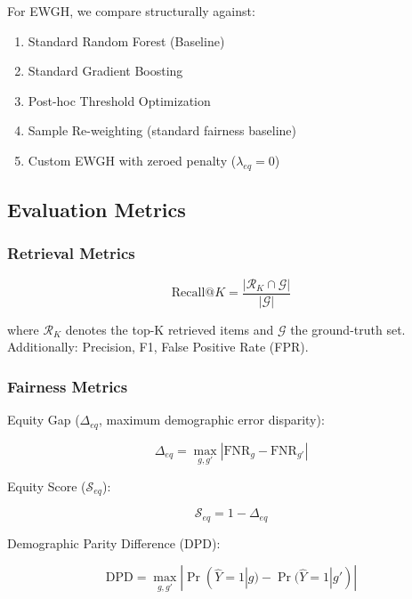 \documentclass[conference]{IEEEtran}
\begin{document}
For EWGH, we compare structurally against:
\begin{enumerate}
    \item Standard Random Forest (Baseline)
    \item Standard Gradient Boosting
    \item Post-hoc Threshold Optimization
    \item Sample Re-weighting (standard fairness baseline)
    \item Custom EWGH with zeroed penalty ($\lambda_{eq} = 0$)
\end{enumerate}

\subsection{Evaluation Metrics}

\subsubsection{Retrieval Metrics}

\begin{equation}
\text{Recall}@K = \frac{|\mathcal{R}_K \cap \mathcal{G}|}{|\mathcal{G}|}
\end{equation}

where $\mathcal{R}_K$ denotes the top-K retrieved items and $\mathcal{G}$ the ground-truth set. Additionally: Precision, F1, False Positive Rate (FPR).

\subsubsection{Fairness Metrics}

Equity Gap ($\Delta_{eq}$, maximum demographic error disparity):

\begin{equation}
\Delta_{eq} = \max_{g, g'} |\text{FNR}_g - \text{FNR}_{g'}|
\end{equation}

Equity Score ($\mathcal{S}_{eq}$):

\begin{equation}
\mathcal{S}_{eq} = 1 - \Delta_{eq}
\end{equation}

Demographic Parity Difference (DPD):

\begin{equation}
\label{eq:dpd}
\text{DPD} = \max_{g, g'} |\Pr(\hat{Y}=1|g) - \Pr(\hat{Y}=1|g')|
\end{equation}
\end{document}
